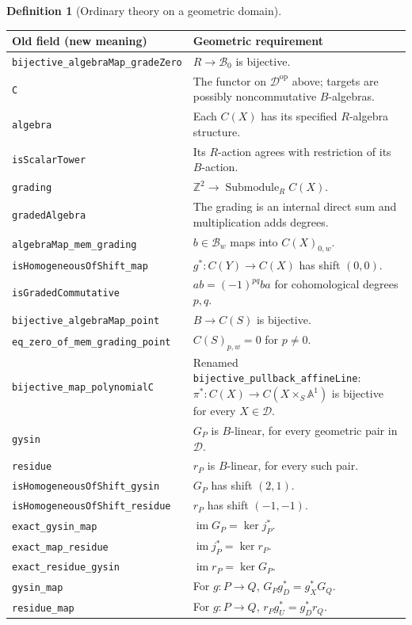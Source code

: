 \documentclass[11pt]{article}
\newcommand{\A}{\mathbb A}
\newcommand{\Z}{\mathbb Z}
\newcommand{\im}{\operatorname{im}}
\newcommand{\planned}[1]{\texttt{\detokenize{#1}}}
\theoremstyle{definition}
\newtheorem{definition}[theorem]{Definition}
\theoremstyle{remark}
\newcommand{\Dom}{\mathcal D}
\newcommand{\op}{\mathrm{op}}
\renewcommand{\planned}[1]{\nolinkurl{#1}}
\begin{document}
\begin{definition}[Ordinary theory on a geometric domain]
\small
\begin{longtable}{p{}p{}}
\toprule Old field (new meaning) & Geometric requirement\\\midrule\endhead
\planned{bijective_algebraMap_gradeZero} & $R\to\mathcal B_0$ is bijective.\\
\planned{C} & The functor on $\Dom^{\op}$ above; targets are possibly noncommutative $B$-algebras.\\
\planned{algebra} & Each $C(X)$ has its specified $R$-algebra structure.\\
\planned{isScalarTower} & Its $R$-action agrees with restriction of its $B$-action.\\
\planned{grading} & $\Z^2\to\operatorname{Submodule}_R C(X)$.\\
\planned{gradedAlgebra} & The grading is an internal direct sum and multiplication adds degrees.\\
\planned{algebraMap_mem_grading} & $b\in\mathcal B_w$ maps into $C(X)_{0,w}$.\\
\planned{isHomogeneousOfShift_map} & $g^*:C(Y)\to C(X)$ has shift $(0,0)$.\\
\planned{isGradedCommutative} & $ab=(-1)^{pq}ba$ for cohomological degrees $p,q$.\\
\planned{bijective_algebraMap_point} & $B\to C(S)$ is bijective.\\
\planned{eq_zero_of_mem_grading_point} & $C(S)_{p,w}=0$ for $p\ne0$.\\
\planned{bijective_map_polynomialC} & Renamed \planned{bijective_pullback_affineLine}: $\pi^*:C(X)\to C(X\times_S\A^1)$ is bijective for every $X\in\Dom$.\\
\planned{gysin} & $G_P$ is $B$-linear, for every geometric pair in $\Dom$.\\
\planned{residue} & $r_P$ is $B$-linear, for every such pair.\\
\planned{isHomogeneousOfShift_gysin} & $G_P$ has shift $(2,1)$.\\
\planned{isHomogeneousOfShift_residue} & $r_P$ has shift $(-1,-1)$.\\
\planned{exact_gysin_map} & $\im G_P=\ker j_P^*$.\\
\planned{exact_map_residue} & $\im j_P^*=\ker r_P$.\\
\planned{exact_residue_gysin} & $\im r_P=\ker G_P$.\\
\planned{gysin_map} & For $g:P\to Q$, $G_Pg_D^*=g_X^*G_Q$.\\
\planned{residue_map} & For $g:P\to Q$, $r_Pg_U^*=g_D^*r_Q$.\\

\end{longtable}
\end{definition}
\end{document}
